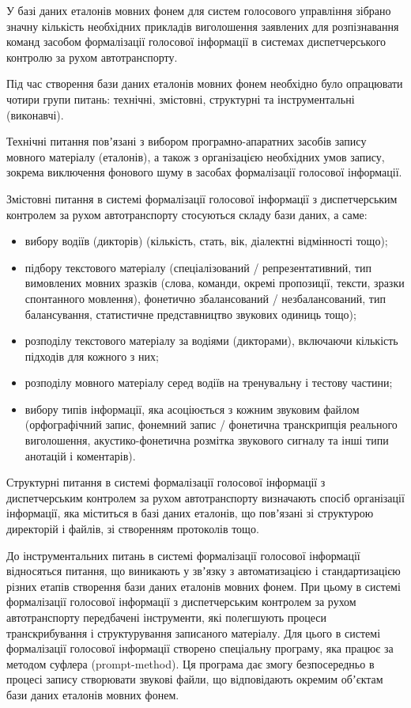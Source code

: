 У базі даних еталонів мовних фонем для систем голосового управління зібрано значну кількість необхідних прикладів виголошення заявлених для розпізнавання команд засобом формалізації голосової інформації в системах диспетчерського контролю за рухом автотранспорту.

Під час створення бази даних еталонів мовних фонем необхідно було опрацювати чотири групи питань: технічні, змістовні, структурні та інструментальні (виконавчі).

Технічні питання повʼязані з вибором програмно-апаратних засобів запису мовного матеріалу (еталонів), а також з організацією необхідних умов запису, зокрема виключення фонового шуму в засобах формалізації голосової інформації.

Змістовні питання в системі формалізації голосової інформації з диспетчерським контролем за рухом автотранспорту стосуються складу бази даних, а саме:

\begin{itemize}
	\item вибору водіїв (дикторів) (кількість, стать, вік, діалектні відмінності тощо);
	\item підбору текстового матеріалу (спеціалізований / репрезентативний, тип вимовлених мовних зразків (слова, команди, окремі пропозиції, тексти, зразки спонтанного мовлення), фонетично збалансований / незбалансований, тип балансування, статистичне представництво звукових одиниць тощо);
	\item розподілу текстового матеріалу за водіями (дикторами), включаючи кількість підходів для кожного з них;
	\item розподілу мовного матеріалу серед водіїв на тренувальну і тестову частини;
	\item вибору типів інформації, яка асоціюється з кожним звуковим файлом (орфографічний запис, фонемний запис / фонетична транскрипція реального виголошення, акустико-фонетична розмітка звукового сигналу та інші типи анотацій і коментарів).
\end{itemize}

Структурні питання в системі формалізації голосової інформації з диспетчерським контролем за рухом автотранспорту визначають спосіб організації інформації, яка міститься в базі даних еталонів, що повʼязані зі структурою директорій і файлів, зі створенням протоколів тощо.

До інструментальних питань в системі формалізації голосової інформації відносяться питання, що виникають у звʼязку з автоматизацією і стандартизацією різних етапів створення бази даних еталонів мовних фонем. При цьому в системі формалізації голосової інформації з диспетчерським контролем за рухом автотранспорту передбачені інструменти, які полегшують процеси транскрибування і структурування записаного матеріалу. Для цього в системі формалізації голосової інформації створено спеціальну програму, яка працює за методом суфлера (prompt-method). Ця програма дає змогу безпосередньо в процесі запису створювати звукові файли, що відповідають окремим обʼєктам бази даних еталонів мовних фонем.

